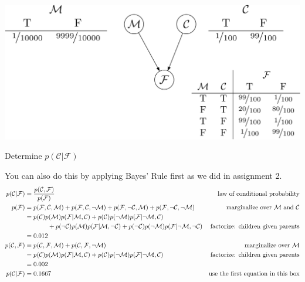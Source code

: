 \documentclass[review_Solutions]{subfiles}
\begin{document}
\begin{exercise}
\begin{center}
\includegraphics[width=0.6\linewidth]{figures/medicaldiagnosis}
\end{center}
\bes
\item Determine $p(\mathcal{C}|\mathcal{F})$
\begin{boxedsolution}
You can also do this by applying Bayes' Rule first as we did in assignment 2.
\begin{align}
p(\mathcal{C}|\mathcal{F}) &= \frac{p(\mathcal{C}, \mathcal{F})}{p(\mathcal{F})} & \mbox{law of conditional probability} \nonumber \\
p(\mathcal{F}) &= p(\mathcal{F}, \mathcal{C}, \mathcal{M}) + p(\mathcal{F}, \mathcal{C}, \neg \mathcal{M}) + p(\mathcal{F}, \neg \mathcal{C}, \mathcal{M}) + p(\mathcal{F}, \neg \mathcal{C}, \neg \mathcal{M}) &\mbox{marginalize over $\mathcal{M}$ and $\mathcal{C}$}\nonumber \\
&= p(\mathcal{C})p(\mathcal{M})p(\mathcal{F}|\mathcal{M},\mathcal{C}) + p(\mathcal{C})p(\neg \mathcal{M})p(\mathcal{F}|\neg \mathcal{M},\mathcal{C}) \nonumber \\
&\hspace{0.5in}+p(\neg \mathcal{C})p(\mathcal{M})p(\mathcal{F}|\mathcal{M},\neg \mathcal{C}) +p(\neg \mathcal{C})p(\neg \mathcal{M})p(\mathcal{F}|\neg \mathcal{M},\neg \mathcal{C}) & \mbox{factorize: children given parents} \nonumber \\
&= 0.012 \nonumber \\
p(\mathcal{C}, \mathcal{F}) &= p(\mathcal{C}, \mathcal{F}, \mathcal{M})  + p(\mathcal{C}, \mathcal{F}, \neg \mathcal{M}) &\mbox{marginalize over $\mathcal{M}$} \nonumber \\
&= p(\mathcal{C})p(\mathcal{M}) p(\mathcal{F}|\mathcal{M}, \mathcal{C}) + p(\mathcal{C})p(\neg \mathcal{M}) p(\mathcal{F}| \neg \mathcal{M}, \mathcal{C})& \mbox{factorize: children given parents} \nonumber \\
&= 0.002 \nonumber \\
p(\mathcal{C}|\mathcal{F}) &=  0.1667 &\mbox{use the first equation in this box} \nonumber
\end{align}
\end{boxedsolution}

\end{exercise}
\end{document}
